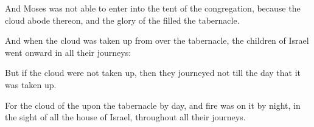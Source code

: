 {And
Moses was not
able to
enter into the
tent of the
congregation, because the
cloud
abode thereon, and the
glory of the
{}
filled the
tabernacle.

And when the
cloud was taken
up
from over the
tabernacle, the
children of
Israel went
onward in all their
journeys:

But if the
cloud were not taken
up, then they
journeyed not till the
day that it was taken
up.

For the
cloud of the
{}
{} upon the
tabernacle by
day, and
fire was on it by
night, in the
sight of all the
house of
Israel, throughout all their
journeys.


\par }